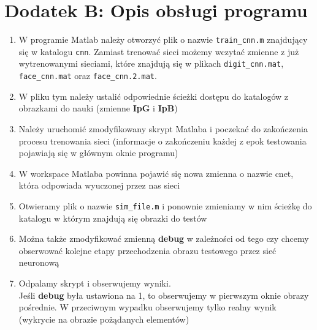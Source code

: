 \documentclass[11pt,a4paper]{article}
\begin{document}
\section{Dodatek B: Opis obsługi programu}
 \begin{enumerate}
\item W programie Matlab należy otworzyć plik o nazwie \verb#train_cnn.m# znajdujący się w katalogu \verb#cnn#. Zamiast trenować sieci możemy wczytać zmienne z już wytrenowanymi sieciami, które znajdują się w plikach \verb#digit_cnn.mat#, \verb#face_cnn.mat# oraz \verb#face_cnn.2.mat#.
\item W pliku tym należy ustalić odpowiednie ścieżki dostępu do katalogów z obrazkami do nauki (zmienne  \textbf{IpG} i  \textbf{IpB})
\item Należy uruchomić zmodyfikowany skrypt Matlaba i poczekać do zakończenia procesu trenowania sieci 
(informacje o zakończeniu każdej z epok testowania pojawiają się w głównym oknie programu)
\item W workspace Matlaba powinna pojawić się nowa zmienna o nazwie cnet, która odpowiada wyuczonej przez nas sieci
\item Otwieramy plik o nazwie \verb#sim_file.m# i ponownie zmieniamy w nim ścieżkę do katalogu w którym znajdują się
obrazki do testów
\item Można także zmodyfikować zmienną  \textbf{debug} w zależności od tego czy chcemy obserwować kolejne
 etapy przechodzenia  obrazu testowego przez sieć neuronową
\item Odpalamy skrypt i obserwujemy wyniki.\\
Jeśli \textbf{debug} była ustawiona na 1, to obserwujemy w pierwszym oknie obrazy pośrednie. W przeciwnym wypadku
obserwujemy tylko realny wynik (wykrycie na obrazie pożądanych elementów)

 \end{enumerate}
\end{document}

